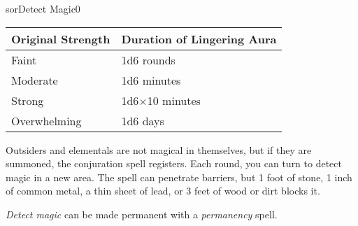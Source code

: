\begin{spellcard}{sor}{Detect Magic}{0}
  \begin{longtable}[]{@{}ll@{}}
    \toprule
    Original Strength & Duration of Lingering Aura\tabularnewline\midrule
    \endhead{}
    Faint             & 1d6 rounds\tabularnewline{}
    Moderate          & 1d6 minutes\tabularnewline{}
    Strong            & 1d6\(\times{}\)10 minutes\tabularnewline{}
    Overwhelming      & 1d6 days\tabularnewline\bottomrule
  \end{longtable}

  Outsiders and elementals are not magical in themselves, but if they are summoned,
  the conjuration spell registers.
  Each round, you can turn to detect magic in a new area.
  The spell can penetrate barriers, but 1 foot of stone, 1 inch of common metal,
  a thin sheet of lead, or 3 feet of wood or dirt blocks it.

  \emph{Detect magic} can be made permanent with a \emph{permanency} spell.
\end{spellcard}
